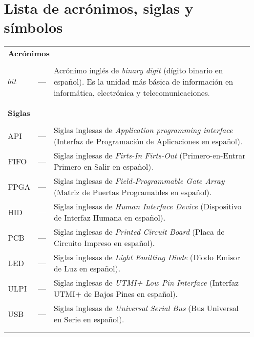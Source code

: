 \chapter*{Lista de acrónimos, siglas y símbolos}
\label{LDS}

\begin{longtable}{lcp{} }

\multicolumn{3}{l}{\textbf{Acrónimos}}\\
\\
$bit$ & --- & Acrónimo inglés de \textit{binary digit} (dígito binario en español). Es la unidad más básica de información en informática, electrónica y telecomunicaciones.\\

\\
\\

\multicolumn{3}{l}{\textbf{Siglas}}\\
\\
API & --- & Siglas inglesas de \textit{Application programming interface} (Interfaz de Programación de Aplicaciones en español).\\

FIFO & --- & Siglas inglesas de \textit{Firts-In Firts-Out} (Primero-en-Entrar Primero-en-Salir en español).\\

FPGA & --- & Siglas inglesas de \textit{Field-Programmable Gate Array} (Matriz de Puertas Programables en español).\\

HID & --- & Siglas inglesas de \textit{Human Interface Device} (Dispositivo de Interfaz Humana en español).\\

PCB & --- & Siglas inglesas de \textit{Printed Circuit Board} (Placa de Circuito Impreso en español).\\

LED & --- & Siglas inglesas de \textit{Light Emitting Diode} (Diodo Emisor de Luz en español).\\

ULPI & --- & Siglas inglesas de \textit{UTMI+ Low Pin Interface} (Interfaz UTMI+ de Bajos Pines en español).\\

USB & --- & Siglas inglesas de \textit{Universal Serial Bus} (Bus Universal en Serie en español).\\

\\
\\


\end{longtable}
